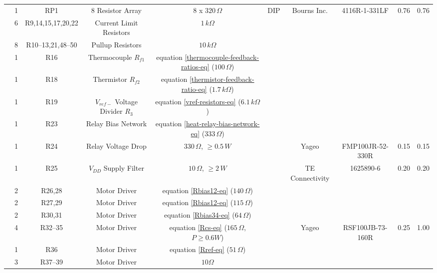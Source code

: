 \documentclass[10pt, twocolumn]{article}
\begin{document}
\begin{center}
\begin{adjustbox}{max width=\textwidth}
\begin{tabular}{c c c c c c c c c c}
	&1	&RP1	&8 Resistor Array	&8 x $320\,\Omega$		&DIP
	&Bourns Inc.		&4116R-1-331LF		&0.76		&0.76		\\

	&6	&R9,14,15,17,20,22	&Current Limit Resistors	&$1\,k\Omega$		&
	&			&			&		&	\\

	&8	&R10--13,21,48--50	&Pullup Resistors	&$10\,k\Omega$		&
	&			&			&		&		\\

	&1	&R16	&Thermocouple $R_{f1}$	&equation \ref{thermocouple-feedback-ratios-eq} ($100\,\Omega$)	&
	&			&			&		&		\\

	&1	&R18	&Thermistor $R_{f2}$	&equation \ref{thermistor-feedback-ratio-eq} ($1.7\,k\Omega$)	&
	&			&			&		&		\\

	&1	&R19	&$V_{ref-}$ Voltage Divider $R_{3}$	&equation \ref{vref-resistors-eq} ($6.1\,k\Omega$)	&
	&			&			&		&		\\

	&1	&R23	&Relay Bias Network		&equation \ref{heat-relay-bias-network-eq} ($333\,\Omega$)	&
	&			&			&		&		\\

	&1	&R24	&Relay Voltage Drop	&$330\,\Omega$, $\geq 0.5\,W$	&
	&Yageo			&FMP100JR-52-330R	&0.15		&0.15		\\

	&1	&R25	&$V_{DD}$ Supply Filter	&$10\,\Omega$, $\geq 2\,W$	&
	&TE Connectivity	&1625890-6		&0.20		&0.20		\\
	
	&2	&R26,28	&Motor Driver	&equation \ref{Rbias12-eq} ($140\,\Omega$)	&
	&			&			&		&		\\

	&2	&R27,29	&Motor Driver	&equation \ref{Rbias12-eq} ($115\,\Omega$)	&
	&			&			&		&		\\

	&2	&R30,31	&Motor Driver	&equation \ref{Rbias34-eq} ($64\,\Omega$)	&
	&			&			&		&		\\

	&4	&R32--35	&Motor Driver	&equation \ref{Rcs-eq} ($165\,\Omega$, $P\geq 0.6W$)	&
	&Yageo			&RSF100JB-73-160R	&0.25		&1.00		\\

	&1	&R36	&Motor Driver		&equation \ref{Rref-eq} ($51\,\Omega$)
	&			&			&		&		\\

	&3	&R37--39	&Motor Driver	&$10\Omega$		&
	&			&			&		&		\\


\end{tabular}
\end{adjustbox}
\end{center}
\end{document}
